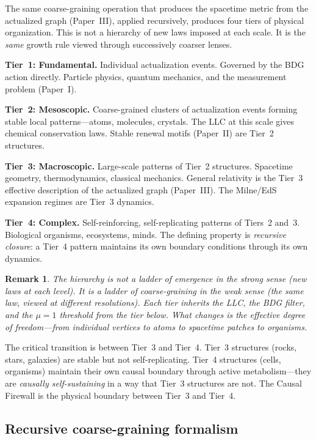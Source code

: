 \documentclass[11pt]{article}
\newtheorem{remark}{Remark}
\begin{document}
The same coarse-graining operation that produces the spacetime metric from the actualized graph (Paper~III), applied recursively, produces four tiers of physical organization. This is not a hierarchy of new laws imposed at each scale. It is the \emph{same} growth rule viewed through successively coarser lenses.

\textbf{Tier~1: Fundamental.} Individual actualization events. Governed by the BDG action directly. Particle physics, quantum mechanics, and the measurement problem (Paper~I).

\textbf{Tier~2: Mesoscopic.} Coarse-grained clusters of actualization events forming stable local patterns---atoms, molecules, crystals. The LLC at this scale gives chemical conservation laws. Stable renewal motifs (Paper~II) are Tier~2 structures.

\textbf{Tier~3: Macroscopic.} Large-scale patterns of Tier~2 structures. Spacetime geometry, thermodynamics, classical mechanics. General relativity is the Tier~3 effective description of the actualized graph (Paper~III). The Milne/EdS expansion regimes are Tier~3 dynamics.

\textbf{Tier~4: Complex.} Self-reinforcing, self-replicating patterns of Tiers~2 and~3. Biological organisms, ecosystems, minds. The defining property is \emph{recursive closure}: a Tier~4 pattern maintains its own boundary conditions through its own dynamics.

\begin{remark}
The hierarchy is not a ladder of emergence in the strong sense (new laws at each level). It is a ladder of coarse-graining in the weak sense (the same law, viewed at different resolutions). Each tier inherits the LLC, the BDG filter, and the $\mu=1$ threshold from the tier below. What changes is the effective degree of freedom---from individual vertices to atoms to spacetime patches to organisms.
\end{remark}

The critical transition is between Tier~3 and Tier~4. Tier~3 structures (rocks, stars, galaxies) are stable but not self-replicating. Tier~4 structures (cells, organisms) maintain their own causal boundary through active metabolism---they are \emph{causally self-sustaining} in a way that Tier~3 structures are not. The Causal Firewall is the physical boundary between Tier~3 and Tier~4.

\subsection{Recursive coarse-graining formalism}
\label{sec:coarse_grain}
\end{document}
